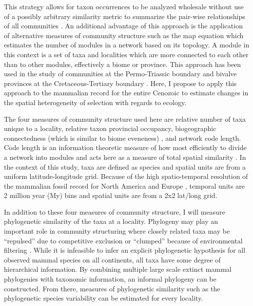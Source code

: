 \documentclass[11pt,letterpaper]{article}
\begin{document}
This strategy allows for taxon occurrences to be analyzed wholesale without use of a possibly arbitrary similarity metric to summarize the pair-wise relationships of all communities \citep{Sidor2013}. An additional advantage of this approach is the application of alternative measures of community structure such as the map equation \citep{Rosvall2008,Rosvall2009a} which estimates the number of modules in a network based on its topology. A module in this context is a set of taxa and localities which are more connected to each other than to other modules, effectively a biome or province. This approach has been used in the study of communities at the Permo-Triassic boundary \citep{Sidor2013} and bivalve provinces at the Cretaceous-Tertiary boundary \citep{Vilhena2013}. Here, I propose to apply this approach to the mammalian record for the entire Cenozoic to estimate changes in the spatial heterogeneity of selection with regards to ecology.

The four measures of community structure used here are relative number of taxa unique to a locality, relative taxon provincial occupancy, biogeographic connectedness (which is similar to biome eveneness) \citep{Sidor2013}, and network code length. Code length is an information theoretic measure of how most efficiently to divide a network into modules and acts here as a measure of total spatial similarity \citep{Rosvall2008,Rosvall2009a}. In the context of this study, taxa are defined as species and spatial units are from a uniform latitude-longitude grid. Because of the high spatio-temporal resolution of the mammalian fossil record for North America and Europe \citep{Alroy2009,Marcot2014,Fortelius2002,Jernvall2004}, temporal units are 2 million year (My) bins and spatial units are from a 2x2 lat/long grid.

In addition to these four measures of community structure, I will measure phylogenetic similarity of the taxa at a locality. Phylogeny may play an important role in community structuring where closely related taxa may be ``repulsed'' due to competitive exclusion or ``clumped'' because of environmental filtering \citep{Webb2002}. While it is infeasible to infer an explicit phylogenetic hypothesis for all observed mammal species on all continents, all taxa have some degree of hierarchical information. By combining multiple large scale extinct mammal phylogenies with taxonomic information, an informal phylogeny can be constructed. From there, measures of phylogenetic similarity such as the phylogenetic species variability \citep{Helmus2007a} can be estimated for every locality. 
\end{document}
